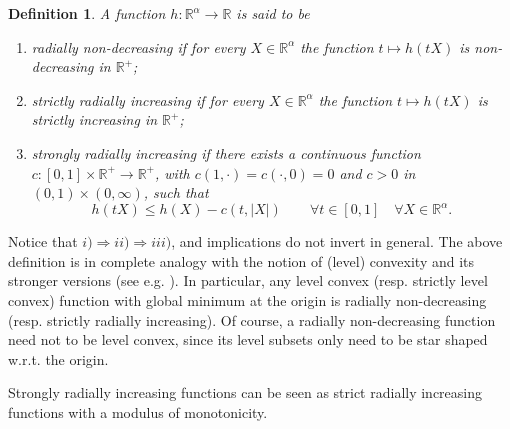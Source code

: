 \documentclass[a4paper,11pt]{article}
\numberwithin{equation}{section}
\newtheorem{Definition}[Theorem]{Definition}
\newcommand{\numberset}{\mathbb}
\newcommand{\R}{\numberset{R}}
\theoremstyle{definition}
\begin{document}
\begin{Definition}\label{def rad}
\indent
A function $h:\R^\alpha\to\R$ is said to be
\begin{enumerate}
\item[i)] radially non-decreasing if for every $X\in\R^\alpha$ the function $t\mapsto h(tX)$ is non-decreasing in $\R^+$;
\item[ii)] strictly radially increasing if for every $X\in\R^\alpha$ the function $t\mapsto h(tX)$ is strictly increasing in $\R^+$;
\item[iii)] strongly radially increasing if there exists a continuous function $c:[0,1]\times\R^+\to\R^+$, with $c(1,\cdot)=c(\cdot,0)=0$ and $c>0$ in $(0,1)\times(0,\infty)$, such that
$$
h(tX)\leq h(X)-c(t,|X|)\qquad\forall t\in[0,1]\quad\forall X\in\R^\alpha.
$$ 
\end{enumerate}
\end{Definition}
Notice that $i)\Rightarrow ii)\Rightarrow iii)$, and implications do not invert in general.
The above definition is in complete analogy with the notion of (level) convexity and its stronger versions (see e.g. \cite{BJW}). In particular, any level convex (resp. strictly level convex) function with global minimum at the origin is radially non-decreasing (resp. strictly radially increasing). Of course, a radially non-decreasing function need not to be level convex, since its level subsets only need to be star shaped w.r.t. the origin.

Strongly radially increasing functions can be seen as strict radially increasing functions with a modulus of monotonicity.
\end{document}
